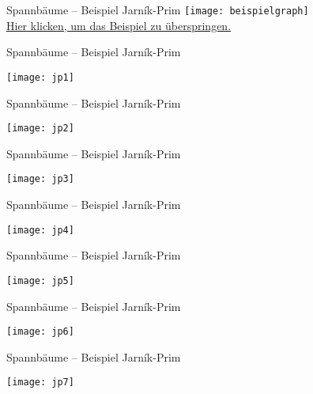 \begin{frame}{Spannbäume – Beispiel Jarník-Prim}
	\centering
	\texttt{[image: beispielgraph]} \\
	\vspace{-.3\baselineskip}\hyperlink{label:afterEx1}{Hier klicken, um das Beispiel zu überspringen.}
\end{frame}

\begin{frame}{Spannbäume – Beispiel Jarník-Prim}
	
		\centering
		\texttt{[image: jp1]}
	
\end{frame}

\begin{frame}{Spannbäume – Beispiel Jarník-Prim}
	
		\centering
		\texttt{[image: jp2]}
	
\end{frame}

\begin{frame}{Spannbäume – Beispiel Jarník-Prim}
	
		\centering
		\texttt{[image: jp3]}
	
\end{frame}

\begin{frame}{Spannbäume – Beispiel Jarník-Prim}
	
		\centering
		\texttt{[image: jp4]}
	
\end{frame}

\begin{frame}{Spannbäume – Beispiel Jarník-Prim}
	
		\centering
		\texttt{[image: jp5]}
	
\end{frame}

\begin{frame}{Spannbäume – Beispiel Jarník-Prim}
	
		\centering
		\texttt{[image: jp6]}
	
\end{frame}

\begin{frame}{Spannbäume – Beispiel Jarník-Prim}
	
		\centering
		\texttt{[image: jp7]}
	
\end{frame}

